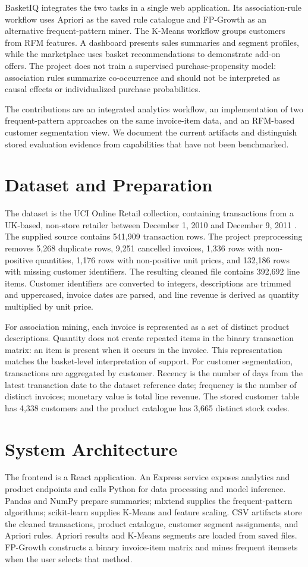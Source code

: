\documentclass[10pt,conference]{IEEEtran}
\begin{document}
BasketIQ integrates the two tasks in a single web application. Its association-rule workflow uses Apriori as the saved rule catalogue and FP-Growth as an alternative frequent-pattern miner. The K-Means workflow groups customers from RFM features. A dashboard presents sales summaries and segment profiles, while the marketplace uses basket recommendations to demonstrate add-on offers. The project does not train a supervised purchase-propensity model: association rules summarize co-occurrence and should not be interpreted as causal effects or individualized purchase probabilities.

The contributions are an integrated analytics workflow, an implementation of two frequent-pattern approaches on the same invoice-item data, and an RFM-based customer segmentation view. We document the current artifacts and distinguish stored evaluation evidence from capabilities that have not been benchmarked.

\section{Dataset and Preparation}
The dataset is the UCI Online Retail collection, containing transactions from a UK-based, non-store retailer between December 1, 2010 and December 9, 2011 \cite{uci}. The supplied source contains 541,909 transaction rows. The project preprocessing removes 5,268 duplicate rows, 9,251 cancelled invoices, 1,336 rows with non-positive quantities, 1,176 rows with non-positive unit prices, and 132,186 rows with missing customer identifiers. The resulting cleaned file contains 392,692 line items. Customer identifiers are converted to integers, descriptions are trimmed and uppercased, invoice dates are parsed, and line revenue is derived as quantity multiplied by unit price.

For association mining, each invoice is represented as a set of distinct product descriptions. Quantity does not create repeated items in the binary transaction matrix: an item is present when it occurs in the invoice. This representation matches the basket-level interpretation of support. For customer segmentation, transactions are aggregated by customer. Recency is the number of days from the latest transaction date to the dataset reference date; frequency is the number of distinct invoices; monetary value is total line revenue. The stored customer table has 4,338 customers and the product catalogue has 3,665 distinct stock codes.

\section{System Architecture}
The frontend is a React application. An Express service exposes analytics and product endpoints and calls Python for data processing and model inference. Pandas and NumPy prepare summaries; mlxtend supplies the frequent-pattern algorithms; scikit-learn supplies K-Means and feature scaling. CSV artifacts store the cleaned transactions, product catalogue, customer segment assignments, and Apriori rules. Apriori results and K-Means segments are loaded from saved files. FP-Growth constructs a binary invoice-item matrix and mines frequent itemsets when the user selects that method.
\end{document}
